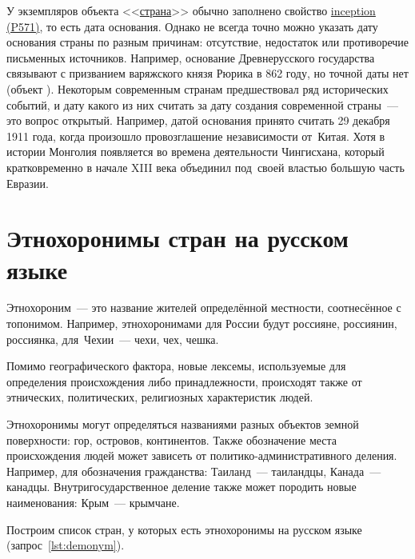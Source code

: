     У экземпляров объекта <<\href{https://www.wikidata.org/wiki/Q6256}{страна}>> обычно заполнено свойство \href{https://www.wikidata.org/wiki/Property:P571}{inception (P571)}, то есть дата основания. Однако не всегда точно можно  указать дату основания страны по разным причинам: отсутствие, недостаток или противоречие письменных источников. Например, основание Древнерусского государства связывают с призванием варяжского князя Рюрика в 862 году, но точной даты нет (объект ). 
Некоторым современным странам предшествовал ряд исторических событий, 
и дату какого из них считать за дату создания современной страны~--- это вопрос открытый. 
Например, датой основания  принято считать 29 декабря 1911 года, 
когда произошло провозглашение независимости от~Китая. 
Хотя в истории Монголия появляется во времена деятельности Чингисхана, 
который кратковременно в начале XIII 
века объединил под~своей властью большую часть Евразии.



\section{Этнохоронимы стран на русском языке}

Этнохороним~--- это название жителей определённой местности, соотнесённое с топонимом. 
Например, этнохоронимами для России будут россияне, россиянин, россиянка, 
для~Чехии~--- чехи, чех, чешка.

Помимо географического фактора, новые лексемы, 
    используемые для определения происхождения либо принадлежности, 
    происходят также от этнических, политических, религиозных характеристик людей\autocite{Zhuravleva2012}. 

Этнохоронимы могут определяться названиями разных объектов земной поверхности: 
    гор, островов, континентов. 
    Также обозначение места происхождения людей может зависеть от политико-административного деления. 
    Например, для обозначения гражданства: Таиланд~--- таиландцы, Канада~--- канадцы. 
    Внутригосударственное деление также может породить новые наименования: Крым~--- крымчане.



\newpage
Построим список стран, у которых есть этнохоронимы на русском языке (запрос~\ref{lst:demonym}).


